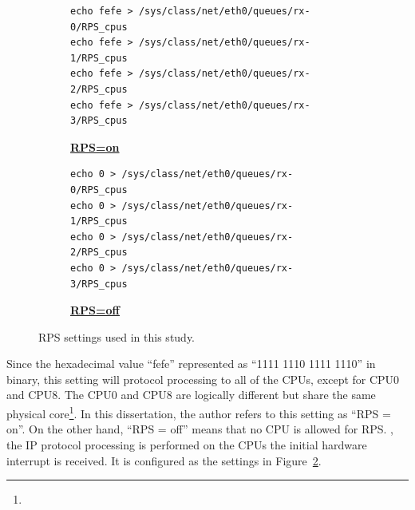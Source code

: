 \begin{figure}[h]

  \begin{subfigure}[t]{\columnwidth}
    \centering
    \begin{minipage}{0.9\columnwidth}
\begin{verbatim}
echo fefe > /sys/class/net/eth0/queues/rx-0/RPS_cpus
echo fefe > /sys/class/net/eth0/queues/rx-1/RPS_cpus
echo fefe > /sys/class/net/eth0/queues/rx-2/RPS_cpus
echo fefe > /sys/class/net/eth0/queues/rx-3/RPS_cpus
\end{verbatim}
    \end{minipage}
    \caption{\underline{\textbf{RPS=on}}}
    \label{fig:rps=on}
  \end{subfigure}

  \par\bigskip

  \begin{subfigure}[t]{\columnwidth}
    \centering
    \begin{minipage}{0.9\columnwidth}
\begin{verbatim}
echo 0 > /sys/class/net/eth0/queues/rx-0/RPS_cpus
echo 0 > /sys/class/net/eth0/queues/rx-1/RPS_cpus
echo 0 > /sys/class/net/eth0/queues/rx-2/RPS_cpus
echo 0 > /sys/class/net/eth0/queues/rx-3/RPS_cpus
\end{verbatim}
    \end{minipage}
    \caption{\underline{\textbf{RPS=off}}}
    \label{fig:rps=off}
  \end{subfigure}

  \par\bigskip
  \centering
  \begin{minipage}{0.9\columnwidth}
    \caption[RPS settings]{
      RPS settings used in this study.
    }
    \label{fig:rps_settings}
  \end{minipage}

  \par\bigskip
\end{figure}

Since the hexadecimal value \enquote{fefe} represented as \enquote{1111 1110 1111 1110} in binary, 
this setting will  protocol processing to all of the CPUs, except for CPU0 and CPU8.
The CPU0 and CPU8 are logically different but share the same physical core\footnote{}.
In this dissertation, the author refers to this setting as \enquote{RPS = on}.
%
On the other hand, \enquote{RPS = off} means that no CPU is allowed for RPS. 
, the IP protocol processing is performed on the CPUs the initial hardware interrupt is received.
It is configured as the settings in Figure~\ref{fig:rps=off}.

